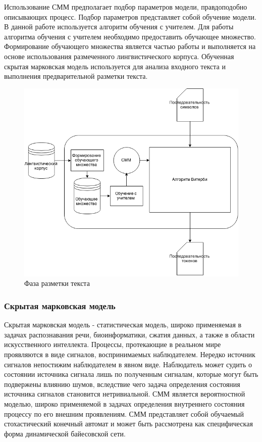 Использование СММ предполагает подбор параметров модели, правдоподобно описывающих процесс. Подбор параметров представляет собой обучение модели. В данной работе используется алгоритм обучения с учителем. Для работы алгоритма обучения с учителем необходимо предоставить обучающее множество. Формирование обучающего множества является частью работы и выполняется на основе использования размеченного лингвистического корпуса. Обученная скрытая марковская модель используется для анализа входного текста и выполнения предварительной разметки текста.

\begin{figure}[H]
	\centering
	\includegraphics[scale=0.7]{img/tokenization.png}
	\caption{Фаза разметки текста}
\end{figure}

\subsubsection{Скрытая марковская модель}
Скрытая марковская модель - статистическая модель, широко применяемая в задачах распознавания речи, биоинформатики, сжатия данных, а также в области искусственного интеллекта. Процессы, протекающие в реальном мире проявляются в виде сигналов, воспринимаемых наблюдателем. Нередко источник сигналов непостижим наблюдателем в явном виде. Наблюдатель может судить о состоянии источника сигнала лишь по полученным сигналам, которые могут быть подвержены влиянию шумов, вследствие чего задача определения состояния источника сигналов становится нетривиальной. СММ является вероятностной моделью, широко применяемой в задачах определения внутреннего состояния процессу по его внешним проявлениям. СММ представляет собой обучаемый стохастический конечный автомат и может быть рассмотрена как специфическая форма динамической байесовской сети.

